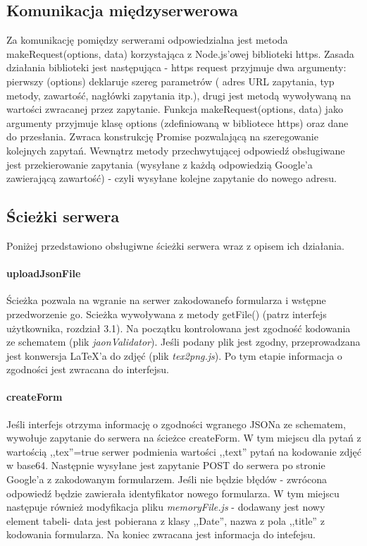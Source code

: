 \subsection{Komunikacja międzyserwerowa}
Za komunikację pomiędzy serwerami odpowiedzialna jest metoda makeRequest(options, data) korzystająca z Node.js'owej biblioteki https. Zasada działania biblioteki jest następująca - https request przyjmuje dwa argumenty: pierwszy (options) deklaruje szereg parametrów ( adres URL zapytania, typ metody, zawartość, nagłówki zapytania itp.), drugi jest metodą wywoływaną na wartości zwracanej przez zapytanie. 
\ind Funkcja makeRequest(options, data) jako argumenty przyjmuje klasę options (zdefiniowaną w bibliotece https) oraz dane do przesłania. Zwraca konstrukcję Promise pozwalającą na szeregowanie kolejnych zapytań. Wewnątrz metody przechwytującej odpowiedź obsługiwane jest przekierowanie zapytania (wysyłane z każdą odpowiedzią Google'a zawierającą zawartość) - czyli wysyłane kolejne zapytanie do nowego adresu.
\subsection{Ścieżki serwera}
Poniżej przedstawiono obsługiwne ścieżki serwera wraz z opisem ich działania.
\paragraph{uploadJsonFile} Ścieżka pozwala na wgranie na serwer zakodowanefo formularza i wstępne przedworzenie go. Scieżka wywoływana z metody getFile() (patrz interfejs użytkownika, rozdział 3.1). Na początku kontrolowana jest zgodność kodowania ze schematem (plik \textit{jaonValidator}). Jeśli podany plik jest zgodny, przeprowadzana jest konwersja \LaTeX{}'a do zdjęć (plik \textit{tex2png.js}). Po tym etapie informacja o zgodności jest zwracana do interfejsu.
\paragraph{createForm} Jeśli interfejs otrzyma informację o zgodności wgranego JSONa ze schematem, wywołuje zapytanie do serwera na ścieżce createForm. W tym miejscu dla pytań z wartością ,,tex''=true serwer podmienia wartości ,,text'' pytań na kodowanie zdjęć w base64. Następnie wysyłane jest zapytanie POST do serwera po stronie Google'a z zakodowanym formularzem. Jeśli nie będzie błędów - zwrócona odpowiedź będzie zawierała identyfikator nowego formularza. W tym miejscu następuje również modyfikacja pliku \textit{memoryFile.js} - dodawany jest nowy element tabeli- data jest pobierana z klasy ,,Date'', nazwa z pola ,,title'' z kodowania formularza. Na koniec zwracana jest informacja do intefejsu.
